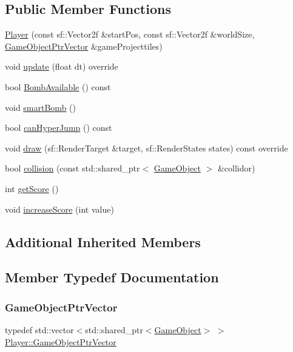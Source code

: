 \subsection*{Public Member Functions}
\begin{DoxyCompactItemize}
\item 
\hyperlink{class_player_a64fb9eae1f16453837b951b04078d8af}{Player} (const sf\+::\+Vector2f \&start\+Pos, const sf\+::\+Vector2f \&world\+Size, \hyperlink{class_player_a2678e391270a5e0fd6c77127657cb4d7}{Game\+Object\+Ptr\+Vector} \&game\+Projecttiles)
\item 
void \hyperlink{class_player_abe2902b7decc38472183a08977eeb57f}{update} (float dt) override
\item 
bool \hyperlink{class_player_a19c3b63145b64941430d4362d2a32129}{Bomb\+Available} () const
\item 
void \hyperlink{class_player_a3f5229f0a7a2e16f65ea174c46f14567}{smart\+Bomb} ()
\item 
bool \hyperlink{class_player_a4b862816fdb015fa1c399d28d3620088}{can\+Hyper\+Jump} () const
\item 
void \hyperlink{class_player_a0ca934f76860c378cd991a8a32f27edd}{draw} (sf\+::\+Render\+Target \&target, sf\+::\+Render\+States states) const override
\item 
bool \hyperlink{class_player_a669d12e0034e51489a37268b2ca7aab0}{collision} (const std\+::shared\+\_\+ptr$<$ \hyperlink{class_game_object}{Game\+Object} $>$ \&collidor)
\item 
int \hyperlink{class_player_a97e5447778ae6c384eedc532dcd8431d}{get\+Score} ()
\item 
void \hyperlink{class_player_ae94e58713320d69a0b36c7b864cb6178}{increase\+Score} (int value)
\end{DoxyCompactItemize}
\subsection*{Additional Inherited Members}


\subsection{Member Typedef Documentation}
\mbox{\label{class_player_a2678e391270a5e0fd6c77127657cb4d7}} 
\subsubsection{\texorpdfstring{Game\+Object\+Ptr\+Vector}{GameObjectPtrVector}}
{\footnotesize\ttfamily typedef std\+::vector$<$std\+::shared\+\_\+ptr$<$\hyperlink{class_game_object}{Game\+Object}$>$ $>$ \hyperlink{class_player_a2678e391270a5e0fd6c77127657cb4d7}{Player\+::\+Game\+Object\+Ptr\+Vector}}



